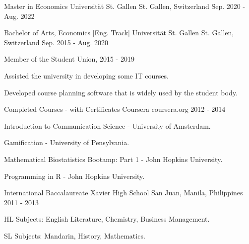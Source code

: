 \begin{cventries}
  \cventry
    {Master in Economics} %
    {Universität St. Gallen} %
    {St. Gallen, Switzerland} %
    {Sep. 2020 - Aug. 2022} %
    {} %
    {
      \begin{cvitems} %
      \end{cvitems}
    }
  \cventry
    {Bachelor of Arts, Economics [Eng. Track]} %
    {Universität St. Gallen} %
    {St. Gallen, Switzerland} %
    {Sep. 2015 - Aug. 2020} %
    {} %
    {
      \begin{cvitems} %
        \item {Member of the Student Union, 2015 - 2019}
        \item {Assisted the university in developing some IT courses.}
        \item {Developed course planning software that is widely used by the student body.}
      \end{cvitems}
    }

  \cventry
  {Completed Courses - with Certificates} %
  {Coursera} %
  {coursera.org} %
  {2012 - 2014} %
  {} %
  {
    \begin{cvitems} %
        \item {Introduction to Communication Science - University of Amsterdam.}
        \item {Gamification - University of Pensylvania.}
        \item {Mathematical Biostatistics Bootamp: Part 1 - John Hopkins University.}
        \item {Programming in R - John Hopkins University.}
    \end{cvitems}
  }

  \cventry
    {International Baccalaureate} %
    {Xavier High School} %
    {San Juan, Manila, Philippines} %
    {2011 - 2013} %
    {} %
    {
      \begin{cvitems} %
        \item {HL Subjects: English Literature, Chemistry, Business Management.}
        \item {SL Subjects: Mandarin, History, Mathematics.}
      \end{cvitems}
    }

\end{cventries}
